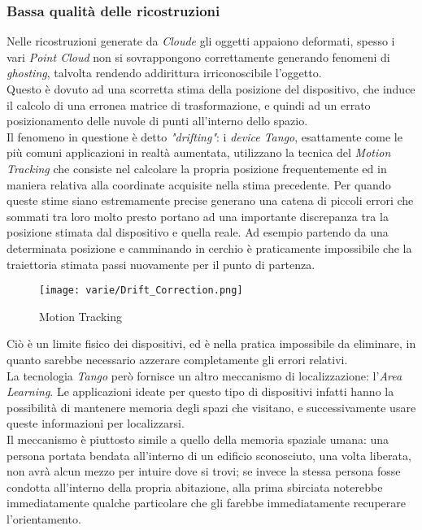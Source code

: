 \subsubsection{Bassa qualità delle ricostruzioni}
Nelle ricostruzioni generate da \emph{Cloude} gli oggetti appaiono deformati, spesso i vari \emph{Point Cloud} non si sovrappongono correttamente generando fenomeni di \emph{ghosting}, talvolta rendendo addirittura irriconoscibile l'oggetto.\\
Questo è dovuto ad una scorretta stima della posizione del dispositivo, che induce il calcolo di una erronea matrice di trasformazione, e quindi ad un errato posizionamento delle nuvole di punti all'interno dello spazio.\\
Il fenomeno in questione è detto \emph{"drifting"}: i \emph{device Tango}, esattamente come le più comuni applicazioni in realtà aumentata, utilizzano la tecnica del \emph{Motion Tracking} che consiste nel calcolare la propria posizione frequentemente ed in maniera relativa alla coordinate acquisite nella stima precedente. Per quando queste stime siano estremamente precise generano una catena di piccoli errori che sommati tra loro molto presto portano ad una importante discrepanza tra la posizione stimata dal dispositivo e quella reale. Ad esempio partendo da una determinata posizione e camminando in cerchio è praticamente impossibile che la traiettoria stimata passi nuovamente per il punto di partenza.
\begin{figure}[!h] 
    \centering 
    \texttt{[image: varie/Drift\_Correction.png]} 
    \caption{Motion Tracking}
\end{figure}
Ciò è un limite fisico dei dispositivi, ed è nella pratica impossibile da eliminare, in quanto sarebbe necessario azzerare completamente gli errori relativi.\\
La tecnologia \emph{Tango} però fornisce un altro meccanismo di localizzazione: l'\emph{Area Learning}. Le applicazioni ideate per questo tipo di dispositivi infatti hanno la possibilità di mantenere memoria degli spazi che visitano, e successivamente usare queste informazioni per localizzarsi.\\
Il meccanismo è piuttosto simile a quello della memoria spaziale umana: una persona portata bendata all'interno di un edificio sconosciuto, una volta liberata, non avrà alcun mezzo per intuire dove si trovi; se invece la stessa persona fosse condotta all'interno della propria abitazione, alla prima sbirciata noterebbe immediatamente qualche particolare che gli farebbe immediatamente recuperare l'orientamento.\\
